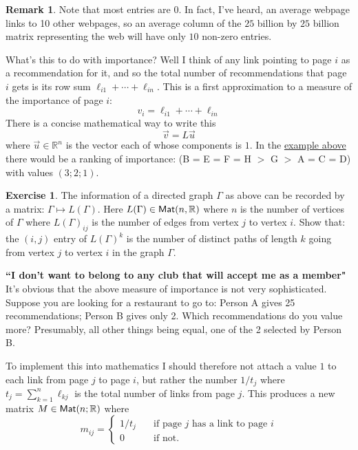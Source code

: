 \documentclass[11pt]{amsbook}
\theoremstyle{definition}
\newtheorem{rem}[theorem]{Remark}
\newtheorem{exercise}{Exercise}
\begin{document}
\begin{rem}
Note that most entries are $0$. In fact, I've heard, an average webpage links to 10 other webpages, so an average column of the $25$ billion by $25$ billion matrix representing the web will have only $10$ non-zero entries.
\end{rem}
What's this to do with importance? Well I think of any link pointing to page $i$ as a recommendation for it, and so the total number of recommendations that page $i$ gets is its row sum $\ell_{i1} + \cdots + \ell_{in}$. This is a first approximation to a measure of the importance of page $i$:
$$v_i = \ell_{i1} + \cdots + \ell_{in}$$
There is a concise mathematical way to write this $$\vec{v} = L \vec{u}$$ where $\vec{u}\in \mathbb{R}^n$ is the vector each of whose components is $1$. In the \hyperref[exgraph]{example above} there would be a ranking of importance: (B = E = F = H $>$ G $>$ A = C = D) with values $(3;2;1)$.

\begin{exercise}
The information of a directed graph $\Gamma$ as above can be recorded by a matrix: ${\Gamma}\mapsto L({\Gamma})$. Here $L({\Gamma})\in {\sf Mat}(n, \mathbb{R})$ where $n$ is the number of vertices of ${\Gamma}$ where $L({\Gamma})_{ij}$ is the number of edges from vertex $j$ to vertex $i$. Show that: the $(i,j)$ entry of $L({\Gamma})^k$ is the number of distinct paths of length $k$ going from vertex $j$ to vertex $i$ in the graph ${\Gamma}$.
\end{exercise}

\noindent
{\bf ``I don't want to belong to any club that will accept me as a member"} It's obvious that the above measure of importance is not very sophisticated. Suppose you are looking for a restaurant to go to: Person A gives 25 recommendations; Person B gives only 2. Which recommendations do you value more? Presumably, all other things being equal, one of the 2 selected by Person B.

To implement this into mathematics I should therefore not attach a value $1$ to each link from page $j$ to page $i$, but rather the number $1/t_j$ where $t_j = \sum_{k=1}^n \ell_{kj}$ is the total number of links from page $j$. This produces a new matrix $M\in {\sf Mat}(n; \mathbb{R})$ where $$m_{ij} =  \begin{cases} 1/t_j \quad & \text{if page $j$ has a link to page $i$} \\
 0 & \text{if not}. \end{cases}
$$
\end{document}
